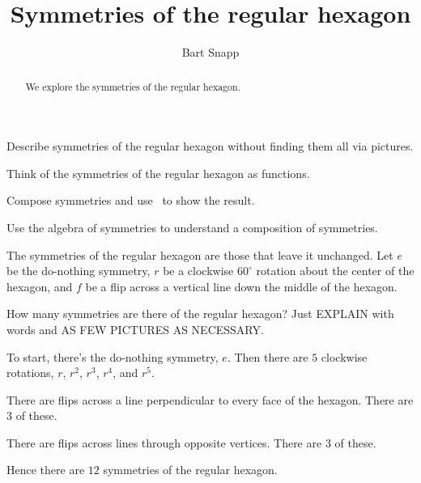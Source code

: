 \documentclass[noauthor,nooutcomes,hints,handout]{ximera}
\title{Symmetries of the regular hexagon}
\author{Bart Snapp}
\begin{document}
\begin{abstract}
  We explore the symmetries of the regular hexagon.
\end{abstract}
\maketitle

\begin{listOutcomes}
\item Describe symmetries of the regular hexagon without finding them
  all via pictures.
\item Think of the symmetries of the regular hexagon as functions.
\item Compose symmetries and use \snap\ to show the result.
\item Use the algebra of symmetries to understand a composition of
  symmetries.
\end{listOutcomes}
\mynewpage


\begin{question}
  The symmetries of the regular hexagon are those that leave it
  unchanged. Let $e$ be the do-nothing symmetry, $r$ be a clockwise
  $60^\circ$ rotation about the center of the hexagon, and $f$ be a
  flip across a vertical line down the middle of the hexagon.

  
  How many symmetries are there of the regular hexagon? Just
  EXPLAIN with words and AS FEW PICTURES AS NECESSARY.
  \begin{freeResponse}
    To start, there's the do-nothing symmetry, $e$. Then there are
    $5$ clockwise rotations, $r$, $r^2$, $r^3$, $r^4$, and $r^5$.

    There are flips across a line perpendicular to every face of the
    hexagon. There are $3$ of these.

    There are flips across lines through opposite vertices. There are
    $3$ of these.

    Hence there are $12$ symmetries of the regular hexagon.
  \end{freeResponse}
\end{question}
\mynewpage
\end{document}
